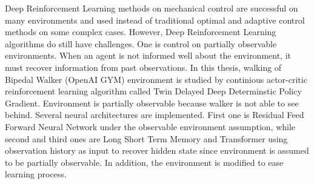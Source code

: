 Deep Reinforcement Learning methods on mechanical control are successful on many environments and used instead of traditional optimal and adaptive control methods on some complex cases. 
However, Deep Reinforcement Learning algorithms do still have challenges. 
One is control on partially observable environments. 
When an agent is not informed well about the environment, it must recover information from past observations. 
In this thesis, walking of Bipedal Walker (OpenAI GYM) environment is studied by continious actor-critic reinforcement learning algorithm called Twin Delayed Deep Determinstic Policy Gradient. Environment is partially observable because walker is not able to see behind. 
Several neural architectures are implemented. 
First one is Residual Feed Forward Neural Network under the observable environment assumption, 
while second and third ones are Long Short Term Memory and Transformer using observation history as input to recover hidden state since environment is assumed to be partially observable. 
In addition, the environment is modified to ease learning process. 
